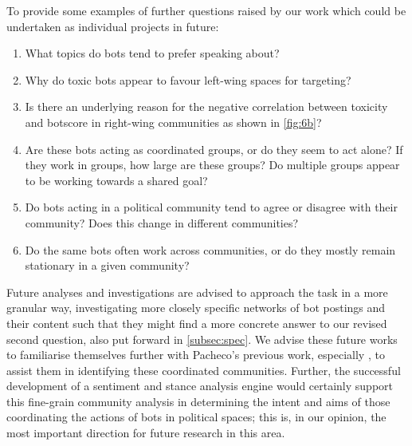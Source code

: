 \documentclass[a4paper,11pt]{article}  %
\begin{document}
	To provide some examples of further questions raised by our work which could be undertaken as individual projects in future:
	\begin{enumerate}
		\item What topics do bots tend to prefer speaking about?
		\item Why do toxic bots appear to favour left-wing spaces for targeting?
		\item Is there an underlying reason for the negative correlation between toxicity and botscore in right-wing communities as shown in \autoref{fig:6b}?
		\item Are these bots acting as coordinated groups, or do they seem to act alone? If they work in groups, how large are these groups? Do multiple groups appear to be working towards a shared goal?
		\item Do bots acting in a political community tend to agree or disagree with their community? Does this change in different communities?
		\item Do the same bots often work across communities, or do they mostly remain stationary in a given community?
	\end{enumerate}
	
	Future analyses and investigations are advised to approach the task in a more granular way, investigating more closely specific networks of bot postings and their content such that they might find a more concrete answer to our revised second question, also put forward in \autoref{subsec:spec}. We advise these future works to familiarise themselves further with Pacheco's previous work, especially \textcite{pachecoUncoveringCoordinatedNetworks2021}, to assist them in identifying these coordinated communities. Further, the successful development of a sentiment and stance analysis engine would certainly support this fine-grain community analysis in determining the intent and aims of those coordinating the actions of bots in political spaces; this is, in our opinion, the most important direction for future research in this area.
	
\end{document}
